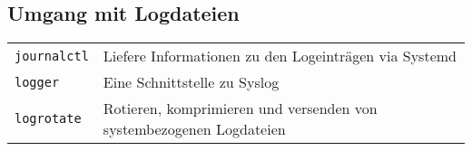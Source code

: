 \documentclass[10pt,a4paper]{article}
\begin{document}
\begin{multicols}{2}
\section{Umgang mit Logdateien}
\begin{tabular}{ p{2.5cm} p{8.5cm} }
  \hline
  \texttt{journalctl} & Liefere Informationen zu den Logeinträgen via Systemd \\
  \rowcolor{Gray}
  \texttt{logger} & Eine Schnittstelle zu Syslog \\
  \texttt{logrotate} & Rotieren, komprimieren und versenden von  systembezogenen Logdateien \\
  \hline
\end{tabular}

\end{multicols}

\newpage

\cheatsheet
\end{document}

